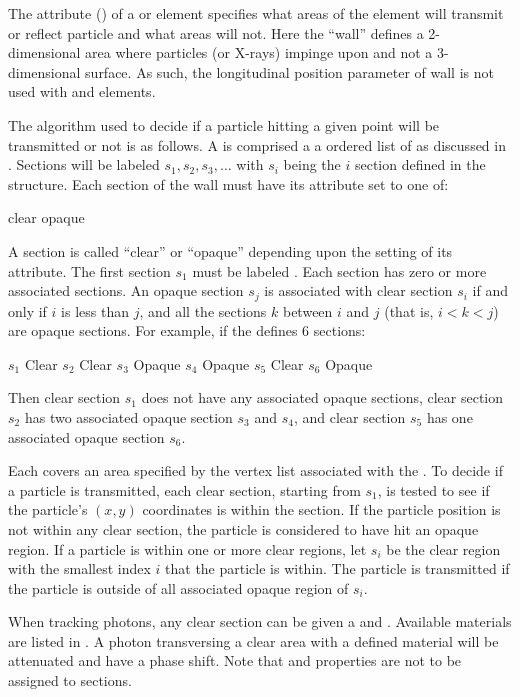 The  attribute () of a  or  element specifies
what areas of the element will transmit or reflect particle and what areas will not. Here the
``wall'' defines a 2-dimensional area where particles (or X-rays) impinge upon and not a
3-dimensional surface.  As such, the  longitudinal position parameter of wall  is
not used with  and  elements.

The algorithm used to decide if a particle hitting a given point will be transmitted or not is as
follows.  A  is comprised a a ordered list of  as discussed in
.  Sections will be labeled $s_1, s_2, s_3, \ldots$ with $s_i$ being the $i$\Th
section defined in the  structure. Each section of the wall must have its 
attribute set to one of:
\begin{example}
  clear
  opaque
\end{example}
A section is called ``clear'' or ``opaque'' depending upon the setting of its  attribute.
The first section $s_1$ must be labeled . Each  section has zero or more
associated  sections. An opaque section $s_j$ is associated with clear section $s_i$ if
and only if $i$ is less than $j$, and all the sections $k$ between $i$ and $j$ (that is, $i < k < j$)
are opaque sections. For example, if the  defines 6 sections:
\begin{example}
  $s_1$   Clear
  $s_2$   Clear
  $s_3$   Opaque
  $s_4$   Opaque
  $s_5$   Clear
  $s_6$   Opaque
\end{example}
Then clear section $s_1$ does not have any associated opaque sections, clear section $s_2$ has two
associated opaque section $s_3$ and $s_4$, and clear section $s_5$ has one associated opaque section
$s_6$.

Each  covers an area specified by the vertex list associated with the . To
decide if a particle is transmitted, each clear section, starting from $s_1$, is tested to see if
the particle's $(x,y)$ coordinates is within the section. If the particle position is not within any
clear section, the particle is considered to have hit an opaque region. If a particle is within one
or more clear regions, let $s_i$ be the clear region with the smallest index $i$ that the particle
is within. The particle is transmitted if the particle is outside of all associated opaque region of
$s_i$.

When tracking photons, any clear section can be given a  and . Available
materials are listed in . A photon transversing a clear area with a defined
material will be attenuated and have a phase shift. Note that  and 
properties are not to be assigned to  sections.

